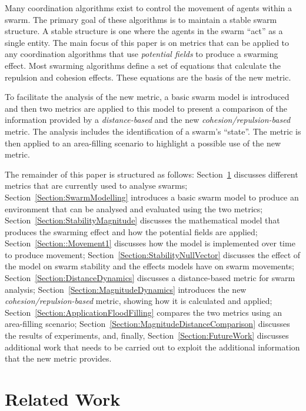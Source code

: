 \documentclass{ieeeaccess}
\begin{document}
Many coordination algorithms exist to control the movement of agents within a
swarm. The primary goal of these algorithms is to maintain a stable swarm
structure. A stable structure is one where the agents in the swarm ``act'' as a
single entity. The main focus of this paper is on metrics that can be
applied to any coordination algorithms that use \textit{potential fields} to
produce a swarming effect. Most swarming algorithms define a set of equations
that calculate the repulsion and cohesion effects. These equations are the
basis of the new metric. 

To facilitate the analysis of the new metric, a basic swarm model is introduced
and then two metrics are applied to this model to present a comparison of the
information provided by a \textit{distance-based} and the new
\textit{cohesion/repulsion-based} metric. The analysis includes the
identification of a swarm's ``state''. The metric is then applied to an 
area-filling scenario to highlight a possible use of the new metric. 

The remainder of this paper is structured as follows:
Section~\ref{Section:Related} discusses different metrics that are currently
used to analyse swarms; Section~\ref{Section:SwarmModelling} introduces a basic
swarm model to produce an environment that can be analysed and evaluated using
the two metrics; Section~\ref{Section:StabilityMagnitude} discusses the
mathematical model that produces the swarming effect and how the potential
fields are applied; Section~\ref{Section::Movement1} discusses how the model is
implemented over time to produce movement;
Section~\ref{Section:StabilityNullVector} discusses the effect of the model on
swarm stability and the effects models have on swarm movements; 
Section~\ref{Section:DistanceDynamics} discusses a distance-based metric for
swarm analysis; Section~\ref{Section:MagnitudeDynamics} introduces the new
\textit{cohesion/repulsion-based} metric, showing how it is calculated and
applied; Section~\ref{Section:ApplicationFloodFilling} compares the two metrics
using an area-filling scenario;
Section~\ref{Section:MagnitudeDistanceComparison} discusses the results of
experiments, and, finally, Section~\ref{Section:FutureWork} discusses
additional work that needs to be carried out to exploit the additional
information that the new metric provides.

\section{Related Work}\label{Section:Related}
\end{document}
